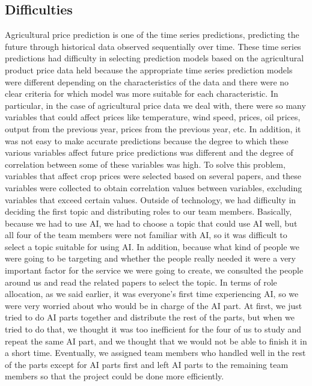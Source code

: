 \documentclass[conference]{IEEEtran}
\begin{document}
\subsection{Difficulties}
    Agricultural price prediction is one of the time series predictions, predicting the future through historical data observed sequentially over time. These time series predictions had difficulty in selecting prediction models based on the agricultural product price data held because the appropriate time series prediction models were different depending on the characteristics of the data and there were no clear criteria for which model was more suitable for each characteristic. In particular, in the case of agricultural price data we deal with, there were so many variables that could affect prices like temperature, wind speed, prices, oil prices, output from the previous year, prices from the previous year, etc. In addition, it was not easy to make accurate predictions because the degree to which these various variables affect future price predictions was different and the degree of correlation between some of these variables was high. To solve this problem, variables that affect crop prices were selected based on several papers, and these variables were collected to obtain correlation values between variables, excluding variables that exceed certain values.
    Outside of technology, we had difficulty in deciding the first topic and distributing roles to our team members. Basically, because we had to use AI, we had to choose a topic that could use AI well, but all four of the team members were not familiar with AI, so it was difficult to select a topic suitable for using AI. In addition, because what kind of people we were going to be targeting and whether the people really needed it were a very important factor for the service we were going to create, we consulted the people around us and read the related papers to select the topic.
    In terms of role allocation, as we said earlier, it was everyone's first time experiencing AI, so we were very worried about who would be in charge of the AI part. At first, we just tried to do AI parts together and distribute the rest of the parts, but when we tried to do that, we thought it was too inefficient for the four of us to study and repeat the same AI part, and we thought that we would not be able to finish it in a short time. Eventually, we assigned team members who handled well in the rest of the parts except for AI parts first and left AI parts to the remaining team members so that the project could be done more efficiently.
\end{document}

